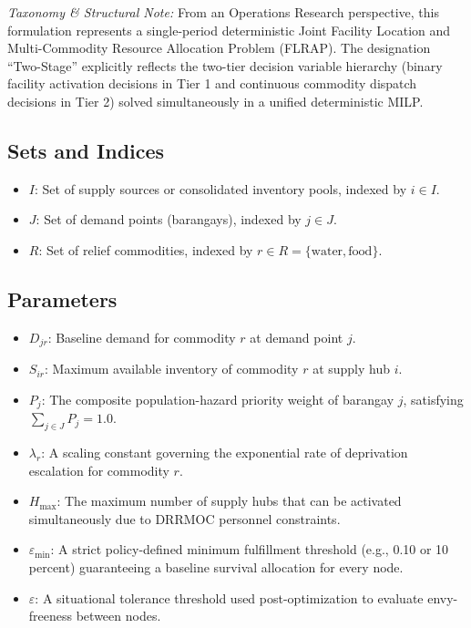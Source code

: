 \noindent \textit{Taxonomy \& Structural Note:} From an Operations Research perspective, this formulation represents a single-period deterministic Joint Facility Location and Multi-Commodity Resource Allocation Problem (FLRAP). The designation ``Two-Stage'' explicitly reflects the two-tier decision variable hierarchy (binary facility activation decisions in Tier 1 and continuous commodity dispatch decisions in Tier 2) solved simultaneously in a unified deterministic MILP.

\subsection{Sets and Indices}
\begin{itemize}
    \item $I$: Set of supply sources or consolidated inventory pools, indexed by $i \in I$.
    \item $J$: Set of demand points (barangays), indexed by $j \in J$.
    \item $R$: Set of relief commodities, indexed by $r \in R = \{\text{water}, \text{food}\}$.
\end{itemize}

\subsection{Parameters}
\begin{itemize}
    \item $D_{jr}$: Baseline demand for commodity $r$ at demand point $j$.
    \item $S_{ir}$: Maximum available inventory of commodity $r$ at supply hub $i$.
    \item $P_j$: The composite population-hazard priority weight of barangay $j$, satisfying $\sum_{j \in J} P_j = 1.0$.
    \item $\lambda_r$: A scaling constant governing the exponential rate of deprivation escalation for commodity $r$.
    \item $H_{\max}$: The maximum number of supply hubs that can be activated simultaneously due to DRRMOC personnel constraints.
    \item $\varepsilon_{\min}$: A strict policy-defined minimum fulfillment threshold (e.g., 0.10 or 10 percent) guaranteeing a baseline survival allocation for every node.
    \item $\varepsilon$: A situational tolerance threshold used post-optimization to evaluate envy-freeness between nodes.
\end{itemize}


